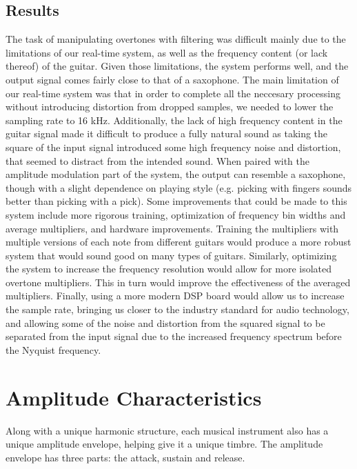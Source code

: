 \documentclass[twoside,a4paper]{article}
\begin{document}
\subsection {Results}
The task of manipulating overtones with filtering was difficult
mainly due to the limitations of our real-time system, as well as
the frequency content (or lack thereof) of the guitar. Given those
limitations, the system performs well, and the output signal comes fairly
close to that of a saxophone. The main limitation of our real-time system
was that in order to complete all the neccesary processing without introducing
distortion from dropped samples, we needed to lower the sampling rate to 16 kHz.
Additionally, the lack of high frequency content in the
guitar signal made it difficult to produce a fully natural sound
as taking the square of the input signal introduced some high frequency
noise and distortion, that seemed to distract from the intended sound.
When paired with the amplitude modulation part of the system, the output
can resemble a saxophone, though with a slight dependence on playing
style (e.g. picking with fingers sounds better than picking with a pick).
\newline\newline
Some improvements that could be made to this system include more rigorous training, optimization of
frequency bin widths and average multipliers, and hardware improvements.
Training the multipliers with multiple versions of each note from different
guitars would produce a more robust system that would sound good
on many types of guitars. Similarly, optimizing the system to increase the
frequency resolution would allow for more isolated overtone multipliers.
This in turn would improve the effectiveness of the averaged multipliers.
Finally, using a more modern DSP board would allow us to increase the sample rate,
bringing us closer to the industry standard for audio technology, and allowing some of the noise
and distortion from the squared signal to be separated from the input signal
due to the increased frequency spectrum before the Nyquist frequency.

\color{black}
\section{Amplitude Characteristics}
Along with a unique harmonic structure, each musical instrument
also has a unique amplitude envelope, helping give it a unique timbre.
The amplitude envelope has three parts: the attack, sustain and release. 
\end{document}
